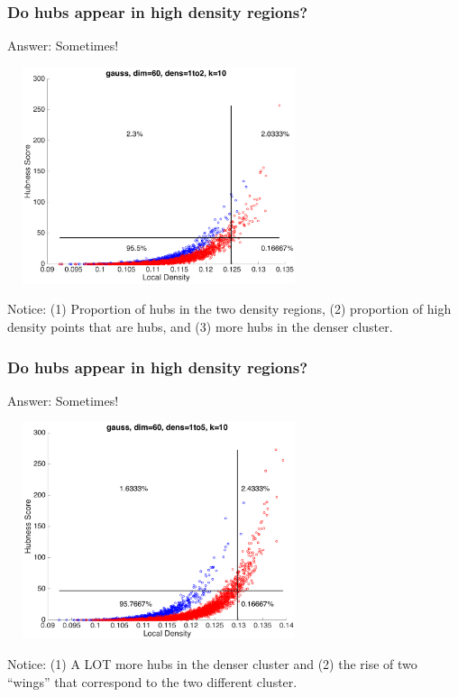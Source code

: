 \documentclass{beamer}
\begin{document}
\begin{frame}
\frametitle{Do hubs appear in high density regions?}

{\small Answer: Sometimes!}

\smallskip

\centering
\includegraphics[width=3.5in,height=2.5in]{./fig/gauss-dim60-1000to2000-k10-DensHub.png}

\smallskip

{\small Notice: (1) Proportion of hubs in the two density regions, (2) proportion of high density points that are hubs, and (3) more hubs in the denser cluster.}

\end{frame}

\begin{frame}
\frametitle{Do hubs appear in high density regions?}

{\small Answer: Sometimes!}

\smallskip

\centering
\includegraphics[width=3.5in,height=2.5in]{./fig/gauss-dim60-1000to5000-k10-DensHub.png}

\smallskip

{\small Notice: (1) A LOT more hubs in the denser cluster and (2) the rise of two ``wings'' that correspond to the two different cluster.}
\end{frame}
\end{document}
